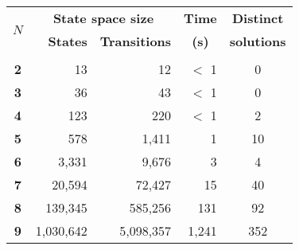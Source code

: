 \begin{tabular}{c|rr|r|c}
\hline
\multirow{2}{*}{$N$} & \multicolumn{2}{|c|}{\bf State space size} &
\multicolumn{1}{|c|}{\bf Time} & \bf Distinct\\
& \bf States & \bf Transitions & \multicolumn{1}{|c|}{\bf (s)} & \bf
solutions\\
\hline
& & & & \\[-3mm]
\bf 2 &        13 &        12 & $<$ 1 &   0\\
\bf 3 &        36 &        43 & $<$ 1 &   0\\
\bf 4 &       123 &       220 & $<$ 1 &   2\\
\bf 5 &       578 &     1,411 &     1 &  10\\
\bf 6 &     3,331 &     9,676 &     3 &   4\\
\bf 7 &    20,594 &    72,427 &    15 &  40\\
\bf 8 &   139,345 &   585,256 &   131 &  92\\
\bf 9 & 1,030,642 & 5,098,357 & 1,241 & 352\\
\hline
\end{tabular}
